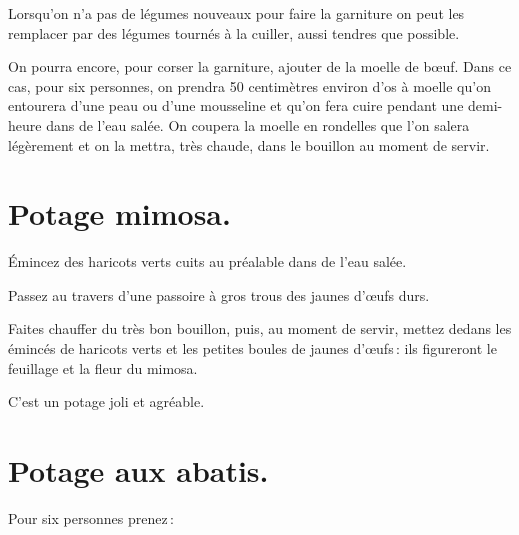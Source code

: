\sk

Lorsqu'on n'a pas de légumes nouveaux pour faire la garniture on peut les
remplacer par des légumes tournés à la cuiller, aussi tendres que possible.

\sk

On pourra encore, pour corser la garniture, ajouter de la moelle de bœuf. Dans
ce cas, pour six personnes, on prendra 50 centimètres environ d'os à moelle
qu'on entourera d’une peau ou d'une mousseline et qu'on fera cuire pendant une
demi-heure dans de l’eau salée. On coupera la moelle en rondelles que l'on
salera légèrement et on la mettra, très chaude, dans le bouillon au moment de
servir.

\section*{\centering Potage mimosa.}

Émincez des haricots verts cuits au préalable dans de l’eau salée.

Passez au travers d'une passoire à gros trous des jaunes d'œufs durs.

Faites chauffer du très bon bouillon, puis, au moment de servir, mettez dedans
les émincés de haricots verts et les petites boules de jaunes d'œufs : ils
figureront le feuillage et la fleur du mimosa.

C'est un potage joli et agréable.

\section*{\centering Potage aux abatis.}

Pour six personnes prenez :

